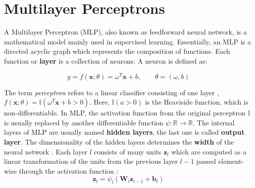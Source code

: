 \section{Multilayer Perceptrons}
\label{sec:Multilayer_Perceptron}
A Multilayer Perceptron (MLP), also known as feedforward neural network, is a mathematical model mainly used in supervised learning. Essentially, an MLP is a directed acyclic graph which represents the composition of functions. Each function or \textbf{layer} is a collection of neurons. A neuron is defined as:

\begin{equation}
    \label{eqn:neuron}
    y = f(\mathbf{x}; \theta) = \omega^T \mathbf{x} + b, \qquad \theta = (\omega, b)
\end{equation}

The term \textit{perceptron} refers to a linear classifier consisting of one layer \cite{rosenblatt1958}, $f(\mathbf{x}; \theta) = \mathbb{I}(\omega^T \mathbf{x} + b > 0)$.
Here, $\mathbb{I}(a>0)$ is the Heaviside function, which is non-differentiable. In MLP, the activation function from the original perceptron $\mathbb{I}$ is usually replaced by another differentiable function $\psi \colon \mathbb{R} \to \mathbb{R}$. The internal layers of MLP are usually named \textbf{hidden layers}, the last one is called \textbf{output layer}. The dimensionality of the hidden layers determines the \textbf{width} of the neural network \cite{goodfellow2016}. Each layer $l$ consists of many units $\mathbf{z}_l$ which are computed as a linear transformation of the units from the previous layer $l-1$ passed element-wise through the activation function \cite{murphy2022}:
\begin{equation*}
    \mathbf{z}_l = \psi_l (\mathbf{W}_l \mathbf{z}_{l-1} + \mathbf{b}_l)
\end{equation*}

